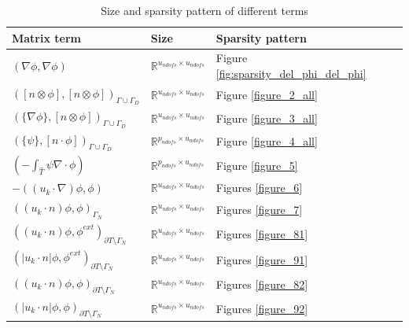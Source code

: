 \documentclass[a4paper,openany]{book}
\begin{document}
\begin{table}[H]
\caption{Size and sparsity pattern of different terms}
\begin{center}
\begin{tabular}{|p{}| p{} |  p{}|}
\hline
\textbf{Matrix term} & \textbf{Size} & \textbf{Sparsity pattern} \\
\hline
$(\nabla \phi, \nabla \phi)$ & $\mathbb{R}^{u_{ndofs} \times u_{ndofs}}$ & Figure \ref{fig:sparsity_del_phi_del_phi}\\
\hline
$([n \otimes \phi],[n \otimes \phi])_{\Gamma \cup \Gamma_D}$ & $\mathbb{R}^{u_{ndofs} \times u_{ndofs}}$ & Figure \ref{figure_2_all}\\
\hline
$(\lbrace \nabla \phi \rbrace,[n \otimes \phi])_{\Gamma \cup \Gamma_D}$ & $\mathbb{R}^{u_{ndofs} \times u_{ndofs}}$ & Figure \ref{figure_3_all}\\
\hline
$(\lbrace \psi \rbrace,[n \cdot \phi])_{\Gamma \cup \Gamma_D}$ & $\mathbb{R}^{p_{ndofs} \times u_{ndofs}}$ & Figure \ref{figure_4_all}\\
\hline
$(- \int_{\hat{T}} \psi \nabla \cdot \phi)$ & $\mathbb{R}^{p_{ndofs} \times u_{ndofs}}$ & Figure \ref{figure_5} \\
\hline
$-((u_k \cdot \nabla)\phi , \phi)$ & $\mathbb{R}^{u_{ndofs} \times u_{ndofs}}$ & Figures \ref{figure_6}\\
\hline
$((u_k \cdot n)\phi , \phi)_{\Gamma_N}$ & $\mathbb{R}^{u_{ndofs} \times u_{ndofs}}$ & Figures \ref{figure_7}\\
\hline
$((u_k \cdot n)\phi,\phi^{ext})_{\partial T \setminus \Gamma_N}$ & $\mathbb{R}^{u_{ndofs} \times u_{ndofs}}$ & Figures \ref{figure_81}\\
\hline
$(|u_k \cdot n|\phi,\phi^{ext})_{\partial T \setminus \Gamma_N}$ & $\mathbb{R}^{u_{ndofs} \times u_{ndofs}}$ & Figures \ref{figure_91}\\
\hline
$((u_k \cdot n)\phi,\phi)_{\partial T \setminus \Gamma_N}$ & $\mathbb{R}^{u_{ndofs} \times u_{ndofs}}$ & Figures \ref{figure_82}\\
\hline
$(|u_k \cdot n|\phi,\phi)_{\partial T \setminus \Gamma_N}$ & $\mathbb{R}^{u_{ndofs} \times u_{ndofs}}$ & Figures \ref{figure_92}\\
\hline
\end{tabular}
\end{center}
\end{table}
\end{document}
